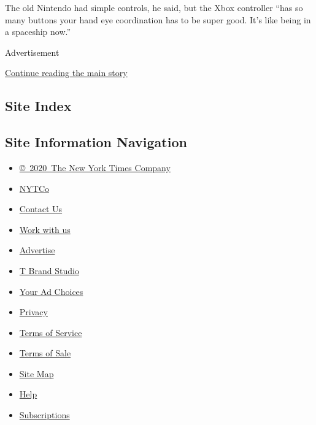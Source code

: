 The old Nintendo had simple controls, he said, but the Xbox controller
``has so many buttons your hand eye coordination has to be super good.
It's like being in a spaceship now.''

Advertisement

\protect\hyperlink{after-bottom}{Continue reading the main story}

\hypertarget{site-index}{%
\subsection{Site Index}\label{site-index}}

\hypertarget{site-information-navigation}{%
\subsection{Site Information
Navigation}\label{site-information-navigation}}

\begin{itemize}
\tightlist
\item
  \href{https://help.nytimes.com/hc/en-us/articles/115014792127-Copyright-notice}{©~2020~The
  New York Times Company}
\end{itemize}

\begin{itemize}
\tightlist
\item
  \href{https://www.nytco.com/}{NYTCo}
\item
  \href{https://help.nytimes.com/hc/en-us/articles/115015385887-Contact-Us}{Contact
  Us}
\item
  \href{https://www.nytco.com/careers/}{Work with us}
\item
  \href{https://nytmediakit.com/}{Advertise}
\item
  \href{http://www.tbrandstudio.com/}{T Brand Studio}
\item
  \href{https://www.nytimes.com/privacy/cookie-policy\#how-do-i-manage-trackers}{Your
  Ad Choices}
\item
  \href{https://www.nytimes.com/privacy}{Privacy}
\item
  \href{https://help.nytimes.com/hc/en-us/articles/115014893428-Terms-of-service}{Terms
  of Service}
\item
  \href{https://help.nytimes.com/hc/en-us/articles/115014893968-Terms-of-sale}{Terms
  of Sale}
\item
  \href{https://spiderbites.nytimes.com}{Site Map}
\item
  \href{https://help.nytimes.com/hc/en-us}{Help}
\item
  \href{https://www.nytimes.com/subscription?campaignId=37WXW}{Subscriptions}
\end{itemize}
